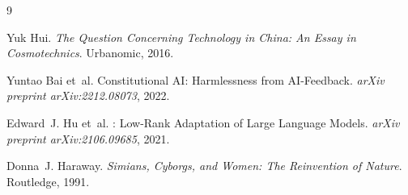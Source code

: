 
\begin{thebibliography}{9}

Yuk Hui.
\newblock \emph{The Question Concerning Technology in China: An Essay in Cosmotechnics}.
\newblock Urbanomic, 2016.

Yuntao Bai et~al.
\newblock Constitutional {AI}: Harmlessness from {AI}-Feedback.
\newblock \emph{arXiv preprint arXiv:2212.08073}, 2022.

Edward~J. Hu et~al.
: Low-Rank Adaptation of Large Language Models.
\newblock \emph{arXiv preprint arXiv:2106.09685}, 2021.

Donna~J. Haraway.
\newblock \emph{Simians, Cyborgs, and Women: The Reinvention of Nature}.
\newblock Routledge, 1991.

\end{thebibliography}
